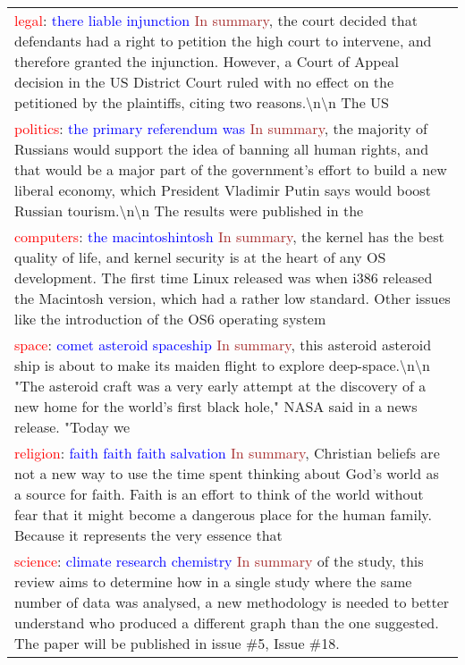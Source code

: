 \begin{table*}
\centering
\small
\begin{tabular}{p{}}
\toprule
\textcolor{red}{legal}: \textcolor{blue}{there liable injunction} \textcolor{brown}{In summary}, the court decided that defendants had a right to petition the high court to intervene, and therefore granted the injunction. However, a Court of Appeal decision in the US District Court ruled with no effect on the petitioned by the plaintiffs, citing two reasons.\textbackslash n\textbackslash n The US \\
\textcolor{red}{politics}: \textcolor{blue}{the primary referendum was} \textcolor{brown}{In summary}, the majority of Russians would support the idea of banning all human rights, and that would be a major part of the government’s effort to build a new liberal economy, which President Vladimir Putin says would boost Russian tourism.\textbackslash n\textbackslash n The results were published in the \\
\textcolor{red}{computers}: \textcolor{blue}{the macintoshintosh} \textcolor{brown}{In summary}, the kernel has the best quality of life, and kernel security is at the heart of any OS development. The first time Linux released was when i386 released the Macintosh version, which had a rather low standard. Other issues like the introduction of the OS6 operating system \\
\textcolor{red}{space}: \textcolor{blue}{comet asteroid spaceship} \textcolor{brown}{In summary}, this asteroid asteroid ship is about to make its maiden flight to explore deep-space.\textbackslash n\textbackslash n "The asteroid craft was a very early attempt at the discovery of a new home for the world's first black hole," NASA said in a news release. "Today we \\
\textcolor{red}{religion}: \textcolor{blue}{faith faith faith salvation} \textcolor{brown}{In summary}, Christian beliefs are not a new way to use the time spent thinking about God's world as a source for faith. Faith is an effort to think of the world without fear that it might become a dangerous place for the human family. Because it represents the very essence that \\
\textcolor{red}{science}: \textcolor{blue}{climate research chemistry} \textcolor{brown}{In summary} of the study, this review aims to determine how in a single study where the same number of data was analysed, a new methodology is needed to better understand who produced a different graph than the one suggested. The paper will be published in issue \#5, Issue \#18. \\

\end{tabular}
\end{table*}
